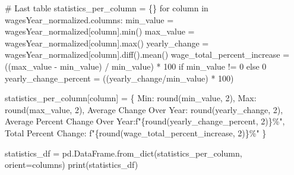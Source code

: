 \documentclass[
  letterpaper,
  DIV=11,
  numbers=noendperiod]{scrartcl}
\newenvironment{Shaded}{\begin{snugshade}}{\end{snugshade}}
\newcommand{\BuiltInTok}[1]{\textcolor[rgb]{0.00,0.23,0.31}{#1}}
\newcommand{\CommentTok}[1]{\textcolor[rgb]{0.37,0.37,0.37}{#1}}
\newcommand{\ControlFlowTok}[1]{\textcolor[rgb]{0.00,0.23,0.31}{#1}}
\newcommand{\DecValTok}[1]{\textcolor[rgb]{0.68,0.00,0.00}{#1}}
\newcommand{\KeywordTok}[1]{\textcolor[rgb]{0.00,0.23,0.31}{#1}}
\newcommand{\NormalTok}[1]{\textcolor[rgb]{0.00,0.23,0.31}{#1}}
\newcommand{\OperatorTok}[1]{\textcolor[rgb]{0.37,0.37,0.37}{#1}}
\newcommand{\SpecialCharTok}[1]{\textcolor[rgb]{0.37,0.37,0.37}{#1}}
\newcommand{\SpecialStringTok}[1]{\textcolor[rgb]{0.13,0.47,0.30}{#1}}
\newcommand{\StringTok}[1]{\textcolor[rgb]{0.13,0.47,0.30}{#1}}
\begin{document}
\begin{Shaded}
\begin{Highlighting}[]
\CommentTok{\# Last table}
\NormalTok{statistics\_per\_column }\OperatorTok{=}\NormalTok{ \{\}}
\ControlFlowTok{for}\NormalTok{ column }\KeywordTok{in}\NormalTok{ wagesYear\_normalized.columns:}
\NormalTok{    min\_value }\OperatorTok{=}\NormalTok{ wagesYear\_normalized[column].}\BuiltInTok{min}\NormalTok{()}
\NormalTok{    max\_value }\OperatorTok{=}\NormalTok{ wagesYear\_normalized[column].}\BuiltInTok{max}\NormalTok{()}
\NormalTok{    yearly\_change }\OperatorTok{=}\NormalTok{ wagesYear\_normalized[column].diff().mean()}
\NormalTok{    wage\_total\_percent\_increase }\OperatorTok{=}\NormalTok{ ((max\_value }\OperatorTok{{-}}\NormalTok{ min\_value) }\OperatorTok{/}\NormalTok{ min\_value) }\OperatorTok{*} \DecValTok{100} \ControlFlowTok{if}\NormalTok{ min\_value }\OperatorTok{!=} \DecValTok{0} \ControlFlowTok{else} \DecValTok{0}
\NormalTok{    yearly\_change\_percent }\OperatorTok{=}\NormalTok{ ((yearly\_change}\OperatorTok{/}\NormalTok{min\_value) }\OperatorTok{*} \DecValTok{100}\NormalTok{)}

\NormalTok{    statistics\_per\_column[column] }\OperatorTok{=}\NormalTok{ \{}
        \StringTok{\textquotesingle{}Min\textquotesingle{}}\NormalTok{: }\BuiltInTok{round}\NormalTok{(min\_value, }\DecValTok{2}\NormalTok{),}
        \StringTok{\textquotesingle{}Max\textquotesingle{}}\NormalTok{: }\BuiltInTok{round}\NormalTok{(max\_value, }\DecValTok{2}\NormalTok{),}
        \StringTok{\textquotesingle{}Average Change Over Year\textquotesingle{}}\NormalTok{: }\BuiltInTok{round}\NormalTok{(yearly\_change, }\DecValTok{2}\NormalTok{),}
        \StringTok{\textquotesingle{}Average Percent Change Over Year\textquotesingle{}}\NormalTok{:}\SpecialStringTok{f"}\SpecialCharTok{\{}\BuiltInTok{round}\NormalTok{(yearly\_change\_percent, }\DecValTok{2}\NormalTok{)}\SpecialCharTok{\}}\SpecialStringTok{\%"}\NormalTok{,}
        \StringTok{\textquotesingle{}Total Percent Change\textquotesingle{}}\NormalTok{: }\SpecialStringTok{f"}\SpecialCharTok{\{}\BuiltInTok{round}\NormalTok{(wage\_total\_percent\_increase, }\DecValTok{2}\NormalTok{)}\SpecialCharTok{\}}\SpecialStringTok{\%"}
\NormalTok{    \}}

\NormalTok{statistics\_df }\OperatorTok{=}\NormalTok{ pd.DataFrame.from\_dict(statistics\_per\_column, orient}\OperatorTok{=}\StringTok{\textquotesingle{}columns\textquotesingle{}}\NormalTok{)}
\BuiltInTok{print}\NormalTok{(statistics\_df)}
\end{Highlighting}
\end{Shaded}
\end{document}
